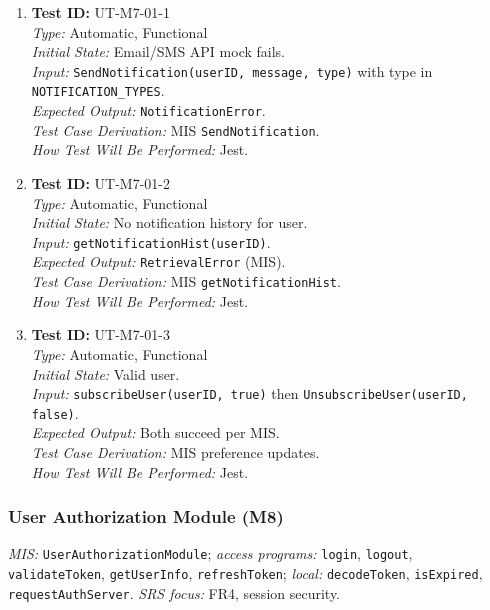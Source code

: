 \documentclass[12pt, titlepage]{article}
\begin{document}
\begin{enumerate}\setlength{\itemsep}{0.85em}
    \item \textbf{Test ID:} UT-M7-01-1\\[0.25em]
    \textit{Type:} Automatic, Functional\\
    \textit{Initial State:} Email/SMS API mock fails.\\
    \textit{Input:} \texttt{SendNotification(userID, message, type)} with type in \texttt{NOTIFICATION\_TYPES}.\\
    \textit{Expected Output:} \texttt{NotificationError}.\\
    \textit{Test Case Derivation:} MIS \texttt{SendNotification}.\\
    \textit{How Test Will Be Performed:} Jest.

    \item \textbf{Test ID:} UT-M7-01-2\\[0.25em]
    \textit{Type:} Automatic, Functional\\
    \textit{Initial State:} No notification history for user.\\
    \textit{Input:} \texttt{getNotificationHist(userID)}.\\
    \textit{Expected Output:} \texttt{RetrievalError} (MIS).\\
    \textit{Test Case Derivation:} MIS \texttt{getNotificationHist}.\\
    \textit{How Test Will Be Performed:} Jest.

    \item \textbf{Test ID:} UT-M7-01-3\\[0.25em]
    \textit{Type:} Automatic, Functional\\
    \textit{Initial State:} Valid user.\\
    \textit{Input:} \texttt{subscribeUser(userID, true)} then \texttt{UnsubscribeUser(userID, false)}.\\
    \textit{Expected Output:} Both succeed per MIS.\\
    \textit{Test Case Derivation:} MIS preference updates.\\
    \textit{How Test Will Be Performed:} Jest.
\end{enumerate}

\subsubsection{User Authorization Module (M8)}

\textit{MIS:} \texttt{UserAuthorizationModule}; \textit{access programs:} \texttt{login}, \texttt{logout}, \texttt{validateToken}, \texttt{getUserInfo}, \texttt{refreshToken}; \textit{local:} \texttt{decodeToken}, \texttt{isExpired}, \texttt{requestAuthServer}. \textit{SRS focus:} FR4, session security.
\end{document}
